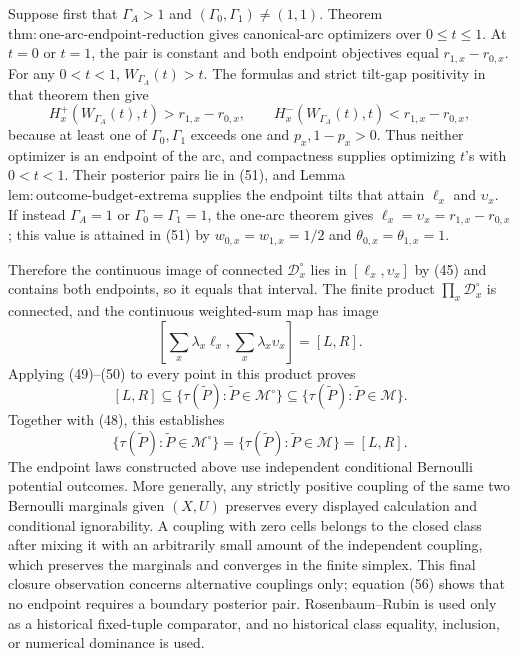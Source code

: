 Suppose first that \(\Gamma_A>1\) and \((\Gamma_0,\Gamma_1)\neq(1,1)\).  Theorem \(\mathrm{thm{:}one\text{-}arc\text{-}endpoint\text{-}reduction}\) gives canonical-arc optimizers over \(0\leq t\leq1\).  At \(t=0\) or \(t=1\), the pair is constant and both endpoint objectives equal \(r_{1,x}-r_{0,x}\).  For any \(0<t<1\), \(W_{\Gamma_A}(t)>t\).  The formulas and strict tilt-gap positivity in that theorem then give
\[
 H_x^+(W_{\Gamma_A}(t),t)>r_{1,x}-r_{0,x},
 \qquad
 H_x^-(W_{\Gamma_A}(t),t)<r_{1,x}-r_{0,x},                             \tag{53}
\]
because at least one of \(\Gamma_0,\Gamma_1\) exceeds one and \(p_x,1-p_x>0\).  Thus neither optimizer is an endpoint of the arc, and compactness supplies optimizing \(t\)'s with \(0<t<1\).  Their posterior pairs lie in (51), and Lemma \(\mathrm{lem{:}outcome\text{-}budget\text{-}extrema}\) supplies the endpoint tilts that attain \(\ell_x\) and \(\upsilon_x\).  If instead \(\Gamma_A=1\) or \(\Gamma_0=\Gamma_1=1\), the one-arc theorem gives \(\ell_x=\upsilon_x=r_{1,x}-r_{0,x}\); this value is attained in (51) by \(w_{0,x}=w_{1,x}=1/2\) and \(\theta_{0,x}=\theta_{1,x}=1\).

Therefore the continuous image of connected \(\mathcal D_x^{\circ}\) lies in \([\ell_x,\upsilon_x]\) by (45) and contains both endpoints, so it equals that interval.  The finite product \(\prod_x\mathcal D_x^{\circ}\) is connected, and the continuous weighted-sum map has image
\[
 \left[\sum_x\lambda_x\ell_x,
       \sum_x\lambda_x\upsilon_x\right]=[L,R].                       \tag{54}
\]
Applying (49)--(50) to every point in this product proves
\[
 [L,R]
 \subseteq\{\tau(\widetilde P):\widetilde P\in\mathcal M^{\circ}\}
 \subseteq\{\tau(\widetilde P):\widetilde P\in\mathcal M\}.
                                                                            \tag{55}
\]
Together with (48), this establishes
\[
 \{\tau(\widetilde P):\widetilde P\in\mathcal M^{\circ}\}
 =\{\tau(\widetilde P):\widetilde P\in\mathcal M\}
 =[L,R].                                                                 \tag{56}
\]
The endpoint laws constructed above use independent conditional Bernoulli potential outcomes.  More generally, any strictly positive coupling of the same two Bernoulli marginals given \((X,U)\) preserves every displayed calculation and conditional ignorability.  A coupling with zero cells belongs to the closed class after mixing it with an arbitrarily small amount of the independent coupling, which preserves the marginals and converges in the finite simplex.  This final closure observation concerns alternative couplings only; equation (56) shows that no endpoint requires a boundary posterior pair.  Rosenbaum--Rubin is used only as a historical fixed-tuple comparator, and no historical class equality, inclusion, or numerical dominance is used.
